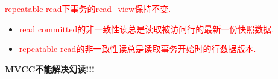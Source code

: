 \textcolor{red}{repeatable read下事务的read\_view保持不变.}

\begin{itemize}
  \item \textcolor{red}{read committed的非一致性读总是读取被访问行的最新一份快照数据.}
  \item \textcolor{red}{repeatable read的非一致性读总是读取事务开始时的行数据版本.}
\end{itemize}

\textbf{MVCC不能解决幻读!!!}
